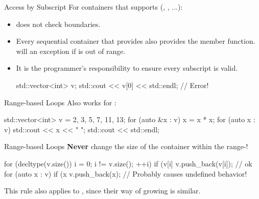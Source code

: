 \begin{frame}[fragile]{Access by Subscript}
    For containers that supports  (, , ...):
    \begin{itemize}
        \item {} does not check boundaries.
        \item Every sequential container that provides  also provides the  member function.  will  an exception if  is out of range.
        \item It is the programmer's responsibility to ensure every subscript is valid.
        \begin{cpp}
std::vector<int> v;
std::cout << v[0] << std::endl; // Error!
        \end{cpp}
    \end{itemize}
\end{frame}

\begin{frame}[fragile]{Range-based  Loops}
    Also works for :
    \begin{cpp}
std::vector<int> v = {2, 3, 5, 7, 11, 13};
for (auto &x : v)
  x = x * x;
for (auto x : v)
  std::cout << x << " ";
std::cout << std::endl;
    \end{cpp}
\end{frame}

\begin{frame}[fragile]{Range-based  Loops}
    \textbf{Never} change the size of the container within the range-!
    \begin{cpp}
for (decltype(v.size()) i = 0; i != v.size(); ++i)
  if (v[i] %
    v.push_back(v[i]); // ok
for (auto x : v)
  if (x %
    v.push_back(x); // Probably causes undefined behavior!
    \end{cpp}
    This rule also applies to , since their way of growing is similar.
\end{frame}